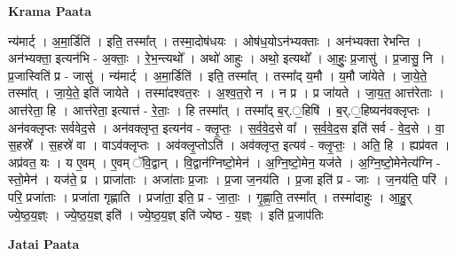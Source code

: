 \documentclass[17pt]{extarticle}
\begin{document}
\textbf{Krama Paata} \newline

न्य॑मार्ट् । अ॒मा॒र्डिति॑ । इति॒ तस्मा᳚त् । तस्मा॒दोष॑धयः । ओष॑ध॒योऽन॑भ्यक्ताः । अन॑भ्यक्ता रेभन्ति । अन॑भ्यक्ता॒ इत्यन॑भि - अ॒क्ताः॒ । रे॒भ॒न्त्यथो᳚ । अथो॑ आहुः । अथो॒ इत्यथो᳚ । आ॒हुः॒ प्र॒जासु॑ । प्र॒जासु॒ नि । प्र॒जास्विति॑ प्र - जासु॑ । न्य॑मार्ट् । अ॒मा॒र्डिति॑ । इति॒ तस्मा᳚त् । तस्मा᳚द् य॒मौ । य॒मौ जा॑येते । जा॒ये॒ते॒ तस्मा᳚त् । जा॒ये॒ते॒ इति॑ जायेते । तस्मा॑दश्वत॒रः । अ॒श्व॒त॒रो न । न प्र । प्र जा॑यते । जा॒य॒त॒ आत्त॑रेताः । आत्त॑रेता॒ हि । आत्त॑रेता॒ इत्यात्त॑ - रे॒ताः॒ । हि तस्मा᳚त् । तस्मा᳚द् ब॒र्.॒हिषि॑ । ब॒र्.॒हिष्यन॑वक्लृप्तः । अन॑वक्लृप्तः सर्ववेद॒से । अन॑वक्लृप्त॒ इत्यन॑व - क्लृ॒प्तः॒ । स॒र्व॒वे॒द॒से वा᳚ । स॒र्व॒वे॒द॒स इति॑ सर्व - वे॒द॒से । वा॒ स॒हस्रे᳚ । स॒हस्रे॑ वा । वाऽव॑क्लृप्तः । अव॑क्लृ॒प्तोऽति॑ । अव॑क्लृप्त॒ इत्यव॑ - क्लृ॒प्तः॒ । अति॒ हि । ह्यप्र॑वत । अप्र॑वत॒ यः । य ए॒वम् । ए॒वम् ॅवि॒द्वान् । वि॒द्वान॑ग्निष्टो॒मेन॑ । अ॒ग्नि॒ष्टो॒मेन॒ यज॑ते । अ॒ग्नि॒ष्टो॒मेनेत्य॑ग्नि - स्तो॒मेन॑ । यज॑ते॒ प्र । प्राजा॑ताः । अजा॑ताः प्र॒जाः । प्र॒जा ज॒नय॑ति । प्र॒जा इति॑ प्र - जाः । ज॒नय॑ति॒ परि॑ । परि॒ प्रजा॑ताः । प्रजा॑ता गृह्णाति । प्रजा॑ता॒ इति॒ प्र - जा॒ताः॒ । गृ॒ह्णा॒ति॒ तस्मा᳚त् । तस्मा॑दाहुः । आ॒हु॒र् ज्ये॒ष्ठ॒य॒ज्ञ्ः । ज्ये॒ष्ठ॒य॒ज्ञ् इति॑ । ज्ये॒ष्ठ॒य॒ज्ञ् इति॑ ज्येष्ठ - य॒ज्ञ्ः । इति॑ प्र॒जाप॑तिः \newline

\textbf{Jatai Paata} \newline
\end{document}
